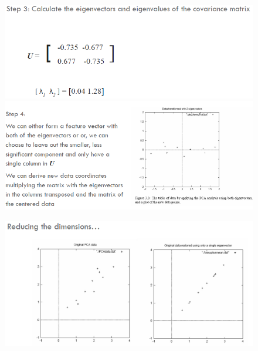\begin{figure}
	\centering
	\begin{minipage}{.5\textwidth}
		\centering
		\includegraphics[width=1\linewidth]{imgs/chapter12/img7}
		\caption{}
		\label{fig:chapter12-07}
	\end{minipage}%
	\begin{minipage}{.5\textwidth}
		\centering
		\includegraphics[width=1\linewidth]{imgs/chapter12/img8}
		\caption{}
		\label{fig:chapter12-08}
	\end{minipage}
\end{figure}

\begin{figure}
	\centering
	\includegraphics[width=0.6\linewidth]{imgs/chapter12/img9}
	\caption{}
	\label{fig:chapter12-09}
\end{figure}

